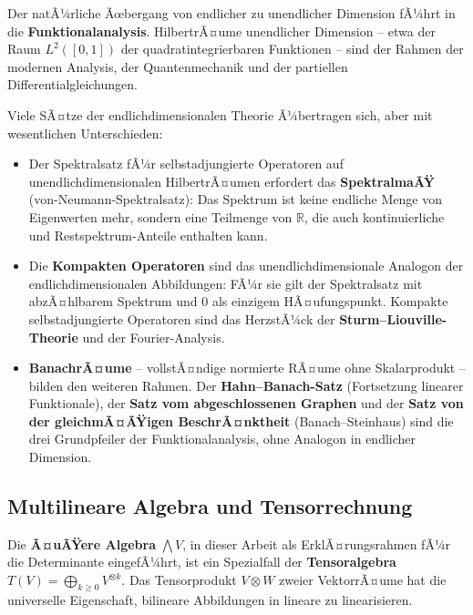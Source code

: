 ﻿\documentclass[a4paper,12pt]{report}
\theoremstyle{definition}
\begin{document}
Der natÃ¼rliche Ãœbergang von endlicher zu unendlicher Dimension
fÃ¼hrt in die \textbf{Funktionalanalysis}. HilbertrÃ¤ume unendlicher
Dimension -- etwa der Raum $L^2([0,1])$ der quadratintegrierbaren
Funktionen -- sind der Rahmen der modernen Analysis, der
Quantenmechanik und der partiellen Differentialgleichungen.

Viele SÃ¤tze der endlichdimensionalen Theorie Ã¼bertragen sich,
aber mit wesentlichen Unterschieden:
\begin{itemize}
    \item[-] Der Spek\-tral\-satz fÃ¼r selbst\-adjungierte Operatoren auf
          un\-end\-lich\-di\-men\-sio\-na\-len Hilbert\-rÃ¤umen erfordert das
          \textbf{SpektralmaÃŸ} (von-Neumann-Spek\-tral\-satz): Das
          Spektrum ist keine endliche Menge von Eigenwerten mehr,
          sondern eine Teilmenge von $\mathbb{R}$, die auch
          kontinuierliche und Restspektrum-Anteile enthalten kann.
    \item[-] Die \textbf{Kompakten Operatoren} sind das un\-end\-lich\-di\-men\-sio\-nale
          Analogon der end\-lich\-di\-men\-sio\-na\-len Abbildungen: FÃ¼r sie gilt
          der Spektralsatz mit abzÃ¤hlbarem Spektrum und $0$ als
          einzigem HÃ¤ufungspunkt. Kompakte selbst\-adjungierte Operatoren
          sind das HerzstÃ¼ck der \textbf{Sturm--Liouville-Theorie}
          und der Fourier-Analysis.
    \item[-] \textbf{BanachrÃ¤ume} -- vollstÃ¤ndige normierte RÃ¤ume
          ohne Skalarprodukt -- bilden den weiteren Rahmen.
          Der \textbf{Hahn--Banach-Satz} (Fortsetzung linearer
          Funktionale), der \textbf{Satz vom abgeschlossenen Graphen}
          und der \textbf{Satz von der gleichmÃ¤ÃŸigen BeschrÃ¤nktheit}
          (Banach--Steinhaus) sind die drei Grundpfeiler der
          Funktionalanalysis, ohne Analogon in endlicher Dimension.
\end{itemize}

\subsection*{Multilineare Algebra und Tensorrechnung}

Die \textbf{Ã¤uÃŸere Algebra} $\bigwedge V$, in dieser Arbeit als
ErklÃ¤rungsrahmen fÃ¼r die Determinante eingefÃ¼hrt, ist ein Spezialfall
der \textbf{Tensoralgebra} $T(V) = \bigoplus_{k \geq 0} V^{\otimes k}$.
Das Tensorprodukt $V \otimes W$ zweier VektorrÃ¤ume hat die universelle
Eigenschaft, bilineare Abbildungen in lineare zu linearisieren.
\end{document}
